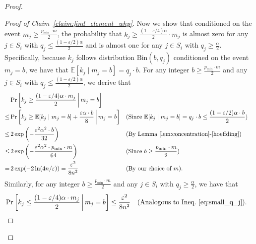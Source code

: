 \documentclass[11pt]{article}
\def \E {\mathbb{E}}
\newcommand{\eps}{\varepsilon}
\begin{document}
\begin{proof}
\begin{proof}[Proof of Claim~\ref{claim:find_element_whp}]
Now we show that conditioned on the event $m_j\ge\frac{p_{\min}\cdot m}{2}$, the probability that $k_j\ge\frac{(1-\eps/4)\alpha}{2}\cdot m_j$ is almost zero for any $j\in S_i$ with $q_j\le\frac{(1-\eps/2)\alpha}{2}$ and is almost one for any $j\in S_i$ with $q_j\ge\frac{\alpha}{2}$. Specifically, because $k_j$ follows distribution $\textrm{Bin}(b,q_j)$ conditioned on the event $m_j=b$, we have that $\E[k_j \mid m_j=b]=q_j\cdot b$. For any integer $b\ge\frac{p_{\min}\cdot m}{2}$ and any $j\in S_i$ with $q_j\le\frac{(1-\eps/2)\alpha}{2}$, we derive that
\begin{align}
    &\Pr\left[k_j\ge \frac{(1-\eps/4)\alpha\cdot m_j}{2} \,\middle\vert\, m_j=b\right]\nonumber\\
    \le& \Pr\left[k_j\ge \E[k_j \mid m_j = b]+\frac{\eps\alpha\cdot b}{8} \,\middle\vert\, m_j=b\right] &&\text{(Since $\E[k_j \mid m_j=b]=q_j\cdot b\le\frac{(1-\eps/2)\alpha\cdot b}{2}$)}\nonumber\\
    \le&\,2\exp\left(-\frac{\eps^2\alpha^2\cdot b}{32}\right) &&\text{(By Lemma~\ref{lem:concentration}-\ref{hoeffding})}\nonumber\\
    \le&\,2\exp\left(-\frac{\eps^2\alpha^2\cdot p_{\min}\cdot m}{64}\right) &&\text{(Since $b\ge\frac{p_{\min}\cdot m}{2}$)}\nonumber\\
    =&\,2\exp(-2\ln(4n/\eps))=\frac{\eps^2}{8n^2} &&\text{(By our choice of $m$)}.\label{eq:small_q_j}
\end{align}
Similarly, for any integer $b\ge\frac{p_{\min}\cdot m}{2}$ and any $j\in S_i$ with $q_j\ge\frac{\alpha}{2}$, we have that
\begin{align}
&\Pr\left[k_j\le \frac{(1-\eps/4)\alpha\cdot m_j}{2} \,\middle\vert\, m_j=b\right]\le\frac{\eps^2}{8n^2} &&\text{(Analogous to Ineq.~\eqref{eq:small_q_j})}.\label{eq:large_q_j}
\end{align}

\end{proof}
\end{proof}
\end{document}
